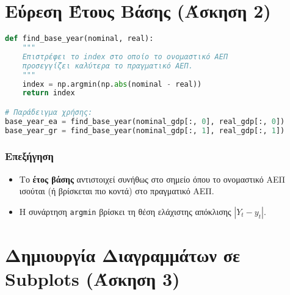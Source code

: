 \documentclass{book}
\begin{document}
\chapter{Εύρεση Έτους Βάσης (Άσκηση 2)}
\label{sec:exercise2}
\begin{tcolorbox}[colback=white,colframe=black,title=Βοηθητική Συνάρτηση για το Έτος Βάσης]
\begin{lstlisting}[language=Python]
def find_base_year(nominal, real):
    """
    Επιστρέφει το index στο οποίο το ονομαστικό ΑΕΠ
    προσεγγίζει καλύτερα το πραγματικό ΑΕΠ.
    """
    index = np.argmin(np.abs(nominal - real))
    return index

# Παράδειγμα χρήσης:
base_year_ea = find_base_year(nominal_gdp[:, 0], real_gdp[:, 0])
base_year_gr = find_base_year(nominal_gdp[:, 1], real_gdp[:, 1])
\end{lstlisting}
\end{tcolorbox}

\subsection*{Επεξήγηση}
\begin{itemize}
  \item Το \textbf{έτος βάσης} αντιστοιχεί συνήθως στο σημείο όπου το ονομαστικό ΑΕΠ ισούται (ή βρίσκεται πιο κοντά) στο πραγματικό ΑΕΠ.
  \item Η συνάρτηση \texttt{argmin} βρίσκει τη θέση ελάχιστης απόκλισης \(|Y_t - y_t|\).
\end{itemize}

\chapter{Δημιουργία Διαγραμμάτων σε Subplots (Άσκηση 3)}
\end{document}
